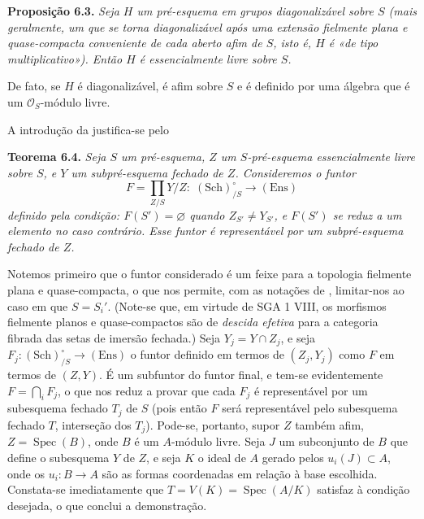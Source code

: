 \medskip
\noindent{}\textbf{Proposição 6.3.}
\textit{Seja \(H\) um pré-esquema em grupos diagonalizável sobre \(S\) (mais
geralmente, um que se torna diagonalizável após uma extensão
fielmente plana e quase-compacta conveniente de cada aberto afim de \(S\),
isto é, \(H\) é «de tipo multiplicativo»). Então \(H\) é essencialmente
livre sobre \(S\).}

De fato, se \(H\) é diagonalizável, é afim sobre \(S\) e é definido
por uma álgebra que é um \(\mathcal O_S\)-módulo livre.

A introdução da 
justifica-se pelo

\medskip
\noindent{}\textbf{Teorema 6.4.}
\textit{Seja \(S\) um pré-esquema, \(Z\) um \(S\)-pré-esquema essencialmente
livre sobre \(S\), e \(Y\) um subpré-esquema fechado de \(Z\). Consideremos
o funtor}
\[
  F=\prod_{Z/S}Y/Z:\;(\mathrm{Sch})_{/S}^{\circ}
    \longrightarrow(\mathrm{Ens})
\]
\textit{definido pela condição: \(F(S')=\varnothing\) quando
\(Z_{S'}\ne Y_{S'}\), e \(F(S')\) se reduz a um elemento no caso
contrário. Esse funtor é representável por um subpré-esquema fechado de \(Z\).}

Notemos primeiro que o funtor considerado é um feixe para a topologia
fielmente plana e quase-compacta, o que nos permite, com as notações de
, limitar-nos ao caso em que
\(S=S_i'\). (Note-se que, em virtude de SGA 1 VIII, os morfismos
fielmente planos e quase-compactos são de \emph{descida efetiva} para a categoria
fibrada das setas de imersão fechada.) Seja \(Y_j=Y\cap Z_j\), e seja
\(F_j:(\mathrm{Sch})_{/S}^{\circ}\to(\mathrm{Ens})\) o funtor definido
em termos de \((Z_j,Y_j)\) como \(F\) em termos de \((Z,Y)\).
É um subfuntor do funtor final, e tem-se evidentemente
\(F=\bigcap_i F_j\), o que nos reduz a provar que cada \(F_j\) é
representável por um subesquema fechado \(T_j\) de \(S\) (pois então
\(F\) será representável pelo subesquema fechado \(T\), interseção dos
\(T_j\)). Pode-se, portanto, supor \(Z\) também afim,
\(Z=\operatorname{Spec}(B)\), onde \(B\) é um \(A\)-módulo livre.
Seja \(J\) um subconjunto de \(B\) que define o subesquema \(Y\) de
\(Z\), e seja \(K\) o ideal de \(A\) gerado pelos
\(u_i(J)\subset A\), onde os \(u_i:B\to A\) são as formas
coordenadas em relação à base escolhida. Constata-se imediatamente que
\(T=V(K)=\operatorname{Spec}(A/K)\) satisfaz à condição desejada, o
que conclui a demonstração.

